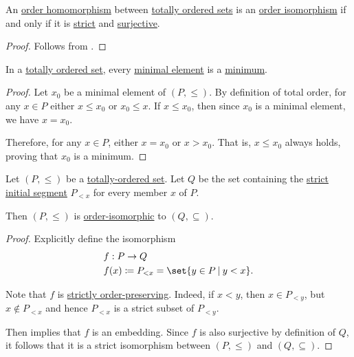 \begin{corollary}\label{thm:totally_ordered_strict_isomorphisms}
  An \hyperref[def:order_homomorphism/increasing]{order homomorphism} between \hyperref[def:totally_ordered_set]{totally ordered sets} is an \hyperref[def:order_homomorphism/embedding]{order isomorphism} if and only if it is \hyperref[def:order_homomorphism/increasing]{strict} and \hyperref[def:function_invertibility/surjective]{surjective}.
\end{corollary}
\begin{proof}
  Follows from .
\end{proof}

\begin{proposition}\label{thm:totally_ordered_minimal_element_is_minimum}
  In a \hyperref[def:totally_ordered_set]{totally ordered set}, every \hyperref[def:extremal_points/maximal_and_minimal_element]{minimal element} is a \hyperref[def:extremal_points/maximum_and_minimum]{minimum}.
\end{proposition}
\begin{proof}
  Let \( x_0 \) be a minimal element of \( (P, \leq) \). By definition of total order, for any \( x \in P \) either \( x \leq x_0 \) or \( x_0 \leq x \). If \( x \leq x_0 \), then since \( x_0 \) is a minimal element, we have \( x = x_0 \).

  Therefore, for any \( x \in P \), either \( x = x_0 \) or \( x > x_0 \). That is, \( x \leq x_0 \) always holds, proving that \( x_0 \) is a minimum.
\end{proof}

\begin{proposition}\label{thm:totally_ordered_segment_isomorphism}
  Let \( (P, \leq) \) be a \hyperref[def:totally_ordered_set]{totally-ordered set}. Let \( Q \) be the set containing the \hyperref[def:order_interval/ray]{strict initial segment} \( P_{<x} \) for every member \( x \) of \( P \).

  Then \( (P, \leq) \) is \hyperref[def:order_homomorphism/isomorphism]{order-isomorphic} to \( (Q, \subseteq) \).
\end{proposition}
\begin{proof}
  Explicitly define the isomorphism
  \begin{equation*}
    \begin{aligned}
      &f: P \to Q \\
      &f(x) \coloneqq P_{<x} = \set{ y \in P \given y < x }.
    \end{aligned}
  \end{equation*}

  Note that \( f \) is \hyperref[def:order_homomorphism/increasing]{strictly order-preserving}. Indeed, if \( x < y \), then \( x \in P_{<y} \), but \( x \not\in P_{<x} \) and hence \( P_{<x} \) is a strict subset of \( P_{<y} \).

  Then  implies that \( f \) is an embedding. Since \( f \) is also surjective by definition of \( Q \), it follows that it is a strict isomorphism between \( (P, \leq) \) and \( (Q, \subseteq) \).
\end{proof}

